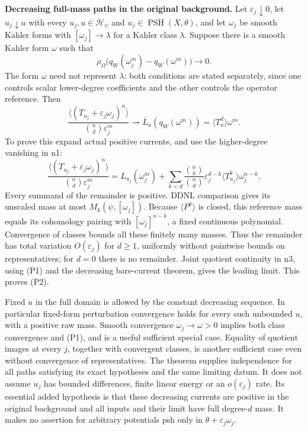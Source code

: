 \documentclass[
  11pt,
]{article}
\begin{document}
\textbf{Decreasing full-mass paths in the original background.} Let
\(\varepsilon_j\downarrow0\), let \(u_j\downarrow u\) with every
\(u_j,u\in\mathcal{H}_\psi\) and \(u_j\in\operatorname{PSH}(X,\theta)\),
and let \(\omega_j\) be smooth Kahler forms with
\([\omega_j]\to\lambda\) for a Kahler class \(\lambda\). Suppose there
is a smooth Kahler form \(\omega\) such that \[
\rho_\Omega\big(q_W(\omega_j^m)-q_W(\omega^m)\big)\longrightarrow0. \tag{P1}
\] The form \(\omega\) need not represent \(\lambda\): both conditions
are stated separately, since one controls scalar lower-degree
coefficients and the other controls the operator reference. Then \[
\frac{\langle(T_{u_j}+\varepsilon_j\omega_j)^n\rangle}
{\binom nd\varepsilon_j^m}
\rightharpoonup\overline L_u(q_W(\omega^m))=\langle T_u^d\rangle\omega^m. \tag{P2}
\] To prove this expand actual positive currents, and use the
higher-degree vanishing in n1: \[
\frac{\langle(T_{u_j}+\varepsilon_j\omega_j)^n\rangle}
{\binom nd\varepsilon_j^m}
=L_{u_j}(\omega_j^m)+
\sum_{k<d}\frac{\binom nk}{\binom nd}\varepsilon_j^{d-k}
\langle T_{u_j}^k\rangle\omega_j^{n-k}. \tag{P3}
\] Every summand of the remainder is positive. DDNL comparison gives its
unscaled mass at most \(M_k(\psi,[\omega_j])\). Because
\(\langle P^k\rangle\) is closed, this reference mass equals its
cohomology pairing with \([\omega_j]^{n-k}\), a fixed continuous
polynomial. Convergence of classes bounds all these finitely many
masses. Thus the remainder has total variation \(O(\varepsilon_j)\) for
\(d\geq1\), uniformly without pointwise bounds on representatives; for
\(d=0\) there is no remainder. Joint quotient continuity in n3, using
(P1) and the decreasing bare-current theorem, gives the leading limit.
This proves (P2).

Fixed \(u\) in the full domain is allowed by the constant decreasing
sequence. In particular fixed-form perturbation convergence holds for
every such unbounded \(u\), with a positive raw mass. Smooth convergence
\(\omega_j\to\omega>0\) implies both class convergence and (P1), and is
a useful sufficient special case. Equality of quotient images at every
\(j\), together with convergent classes, is another sufficient case even
without convergence of representatives. The theorem supplies
independence for all paths satisfying its exact hypotheses and the same
limiting datum. It does not assume \(u_j\) has bounded differences,
finite linear energy or an \(o(\varepsilon_j)\) rate. Its essential
added hypothesis is that these decreasing currents are positive in the
original background and all inputs and their limit have full
degree-\(d\) mass. It makes no assertion for arbitrary potentials psh
only in \(\theta+\varepsilon_j\omega_j\).
\end{document}
